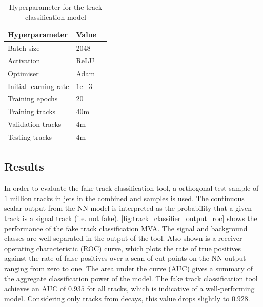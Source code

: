 \begin{table}[!htbp]
  \footnotesize\centering
  \setlength{\tabcolsep}{0.5em} %
  \begin{tabular}{lll}
      \toprule\hline
      \textbf{Hyperparameter} & \textbf{Value} \\
      \hline
      Batch size & 2048 \\
      Activation & ReLU \\
      Optimiser & Adam \\
      Initial learning rate & $1\text{e}{-3}$ \\
      Training epochs & 20 \\
      Training tracks & 40m \\
      Validation tracks & 4m \\
      Testing tracks & 4m \\
      \hline\bottomrule
  \end{tabular}
  \caption{
    Hyperparameter for the track classification model
  }
  \label{tab:fake_track_mva_hyperparams}
\end{table}


\subsection{Results}\label{sec:fake_track_mva_results}


In order to evaluate the fake track classification tool, a orthogonal test sample of $1$ million tracks in jets in the combined \ttbar and \Zprime samples is used.
The continuous scalar output from the NN model is interpreted as the probability that a given track is a signal track (i.e. not fake).
\cref{fig:track_classifier_output_roc} shows the performance of the fake track classification MVA. The signal and background classes are well separated in the output of the tool.
Also shown is a receiver operating characteristic (ROC) curve, which plots the rate of true positives against the rate of false positives over a scan of cut points on the NN output ranging from zero to one.
The area under the curve (AUC) gives a summary of the aggregate classification power of the model.
The fake track classification tool achieves an AUC of $0.935$ for all tracks, which is indicative of a well-performing model.
Considering only tracks from \bhadron decays, this value drops slightly to $0.928$. 

